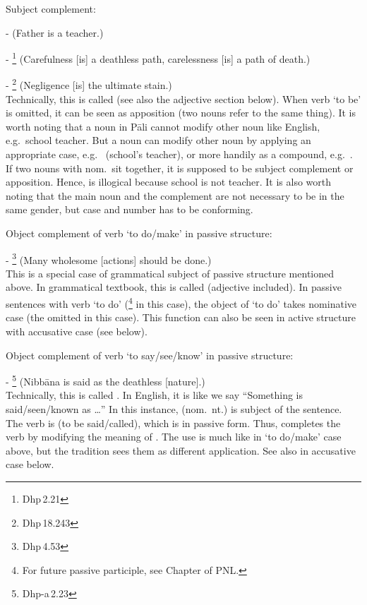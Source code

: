 \begin{compactenum}[(1)]
\item Subject complement:\par
-  (Father is a teacher.)\par
- \footnote{Dhp\,2.21} (Carefulness [is] a deathless path, carelessness [is] a path of death.)\par
- \footnote{Dhp\,18.243} (Negligence [is] the ultimate stain.)\\[1.5mm]
Technically, this is called  (see also the adjective section below). When verb `to be' is omitted, it can be seen as apposition (two nouns refer to the same thing). It is worth noting that a noun in P\=ali cannot modify other noun like English, e.g.\ school teacher. But a noun can modify other noun by applying an appropriate case, e.g.\  (school's teacher), or more handily as a compound, e.g.\ . If two nouns with nom.\ sit together, it is supposed to be subject complement or apposition. Hence,  is illogical because school is not teacher. It is also worth noting that the main noun and the complement are not necessary to be in the same gender, but case and number has to be conforming.\\
\item Object complement of verb `to do/make' in passive structure:\par
- \footnote{Dhp\,4.53} (Many wholesome [actions] should be done.)\\[1.5mm]
This is a special case of grammatical subject of passive structure mentioned above. In grammatical textbook, this is called  (adjective included). In passive sentences with verb `to do' (\footnote{For future passive participle, see Chapter  of PNL.} in this case), the object of `to do' takes nominative case (the omitted  in this case). This function can also be seen in active structure with accusative case (see below).
\item Object complement of verb `to say/see/know' in passive structure:\par
- \footnote{Dhp-a\,2.23} (Nibb\=ana is said as the deathless [nature].)\\[1.5mm]
Technically, this is called . In English, it is like we say ``Something is said/seen/known as \ldots'' In this instance,  (nom.\ nt.) is subject of the sentence. The verb is  (to be said/called), which is in passive form. Thus,  completes the verb by modifying the meaning of . The use is much like in `to do/make' case above, but the tradition sees them as different application. See also in accusative case below.
\end{compactenum}

